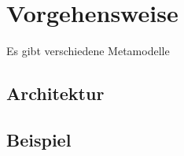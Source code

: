 \section{Vorgehensweise}
Es gibt verschiedene Metamodelle 

\subsection{Architektur}


\subsection{Beispiel}





















